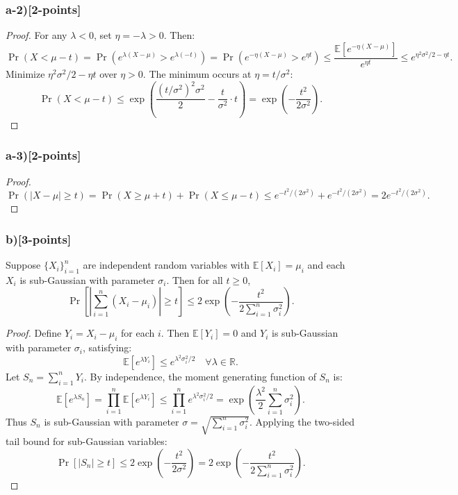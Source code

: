 \documentclass[12pt]{article}
\begin{document}
{{\subsubsection{a-2)[2-points]}
\begin{proof}
For any \( \lambda < 0 \), set \( \eta = -\lambda > 0 \). Then:
\[
\Pr(X < \mu - t) = \Pr(e^{\lambda(X - \mu)} > e^{\lambda (-t)}) = \Pr(e^{-\eta(X - \mu)} > e^{\eta t}) \leq \frac{\mathbb{E}[e^{-\eta(X - \mu)}]}{e^{\eta t}} \leq e^{\eta^2\sigma^2/2 - \eta t}.
\]
Minimize \( \eta^2\sigma^2/2 - \eta t \) over \( \eta > 0 \). The minimum occurs at \( \eta = t/\sigma^2 \):
\[
\Pr(X < \mu - t) \leq \exp\left(\frac{(t/\sigma^2)^2\sigma^2}{2} - \frac{t}{\sigma^2} \cdot t\right) = \exp\left(-\frac{t^2}{2\sigma^2}\right).
\]
\end{proof}

\subsubsection{a-3)[2-points]}
\begin{proof}
\[
\Pr(|X - \mu| \geq t) = \Pr(X \geq \mu + t) + \Pr(X \leq \mu - t) \leq e^{-t^2/(2\sigma^2)} + e^{-t^2/(2\sigma^2)} = 2e^{-t^2/(2\sigma^2)}.
\]
\end{proof}

\subsubsection{b)[3-points]}
Suppose \(\{X_i\}_{i=1}^n\) are independent random variables with \(\mathbb{E}[X_i] = \mu_i\) and each \(X_i\) is sub-Gaussian with parameter \(\sigma_i\). Then for all \(t \geq 0\),
\[
\Pr\left[\left|\sum_{i=1}^n (X_i - \mu_i)\right| \geq t\right] \leq 2 \exp\left(-\frac{t^2}{2 \sum_{i=1}^n \sigma_i^2}\right).
\]

\begin{proof}
Define \(Y_i = X_i - \mu_i\) for each \(i\). Then \(\mathbb{E}[Y_i] = 0\) and \(Y_i\) is sub-Gaussian with parameter \(\sigma_i\), satisfying:
\[
\mathbb{E}[e^{\lambda Y_i}] \leq e^{\lambda^2 \sigma_i^2 / 2} \quad \forall \lambda \in \mathbb{R}.
\]
Let \(S_n = \sum_{i=1}^n Y_i\). By independence, the moment generating function of \(S_n\) is:
\[
\mathbb{E}[e^{\lambda S_n}] = \prod_{i=1}^n \mathbb{E}[e^{\lambda Y_i}] \leq \prod_{i=1}^n e^{\lambda^2 \sigma_i^2 / 2} = \exp\left( \frac{\lambda^2}{2} \sum_{i=1}^n \sigma_i^2 \right).
\]
Thus \(S_n\) is sub-Gaussian with parameter \(\sigma = \sqrt{\sum_{i=1}^n \sigma_i^2}\). Applying the two-sided tail bound for sub-Gaussian variables:
\[
\Pr\left[ |S_n| \geq t \right] \leq 2 \exp\left( -\frac{t^2}{2 \sigma^2} \right) = 2 \exp\left( -\frac{t^2}{2 \sum_{i=1}^n \sigma_i^2} \right).
\]
\end{proof}

}}
\end{document}
